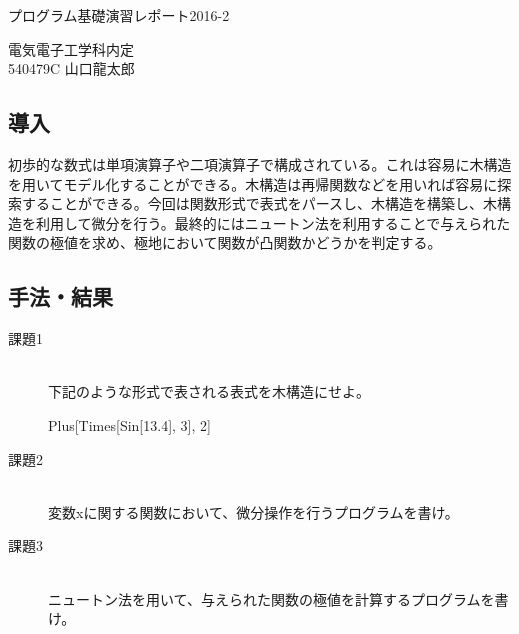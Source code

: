 \documentclass[11pt, oneside]{jsarticle}   	%
\begin{document}
\makeatletter
\begin{center}
    \Large プログラム基礎演習レポート2016-2
\end{center}
\begin{flushright}
    \normalsize 電気電子工学科内定 \\
    \large 540479C 山口龍太郎
\end{flushright}

\subsection*{導入}
    初歩的な数式は単項演算子や二項演算子で構成されている。これは容易に木構造を用いてモデル化することができる。木構造は再帰関数などを用いれば容易に探索することができる。今回は関数形式で表式をパースし、木構造を構築し、木構造を利用して微分を行う。最終的にはニュートン法を利用することで与えられた関数の極値を求め、極地において関数が凸関数かどうかを判定する。

\subsection*{手法・結果}
\begin{description}
    \item[課題1]\mbox{}\\
        下記のような形式で表される表式を木構造にせよ。
        \begin{center}
            Plus[Times[Sin[13.4], 3], 2]\\
        \end{center}
    \item[課題2]\mbox{}\\
        変数xに関する関数において、微分操作を行うプログラムを書け。
    \item[課題3]\mbox{}\\
        ニュートン法を用いて、与えられた関数の極値を計算するプログラムを書け。
\end{description}
\end{document}
